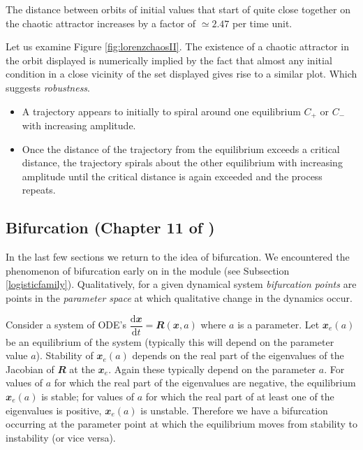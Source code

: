 \documentclass[
  a4paper,
  oneside,
  final]{krantz}
\providecommand{\tightlist}{%
  \setlength{\itemsep}{0pt}\setlength{\parskip}{0pt}}
\renewcommand{\d}{\mathrm{d}}
\renewcommand{\v}[1]{{\mathbfit{#1}}}
\newcommand{\der}[2]{\dfrac{\d #1}{\d #2}}
\theoremstyle{definition}
\theoremstyle{definition}
\theoremstyle{definition}
\theoremstyle{definition}
\theoremstyle{remark}
\begin{document}
The distance between orbits of initial values that start of quite close
together on the chaotic attractor increases by a factor of \(\simeq 2.47\)
per time unit.

Let us examine Figure \ref{fig:lorenzchaosII}. The existence of a
chaotic attractor in the orbit displayed is numerically implied by the fact
that almost any initial condition in a close vicinity of the set
displayed gives rise to a similar plot. Which suggests \emph{robustness}.

\begin{itemize}
\tightlist
\item
  A trajectory appears to initially to spiral around one equilibrium
  \(C_{+}\) or \(C_{-}\) with increasing amplitude.
\item
  Once the distance of the trajectory from the equilibrium exceeds a
  critical distance, the trajectory spirals about the other
  equilibrium with increasing amplitude until the critical distance is
  again exceeded and the process repeats.
\end{itemize}

\hypertarget{bifurcation}{%
\subsection{\texorpdfstring{Bifurcation (Chapter 11 of \citep{ASY})}{Bifurcation (Chapter 11 of {[}@ASY{]})}}\label{bifurcation}}

In the last few sections we return to the idea of bifurcation. We
encountered the phenomenon of bifurcation early on in the module (see
Subsection \ref{logisticfamily}). Qualitatively, for a given dynamical
system \emph{bifurcation points} are points in the \emph{parameter space} at which
qualitative change in the dynamics occur.

Consider a system of ODE's \(\der{\v{x}}{t} = \v{R}(\v{x}, a)\) where \(a\)
is a parameter. Let \(\v{x}_{e}(a)\) be an equilibrium of the system
(typically this will depend on the parameter value \(a\)). Stability of
\(\v{x}_{e}(a)\) depends on the real part of the eigenvalues of the
Jacobian of \(\v{R}\) at the \(\v{x}_{e}\). Again these typically
depend on the parameter \(a\). For values of \(a\) for which the real part
of the eigenvalues are negative, the equilibrium \(\v{x}_{e}(a)\) is
stable; for values of \(a\) for which the real part of at least one of the
eigenvalues is positive, \(\v{x}_{e}(a)\) is unstable. Therefore we have a
bifurcation occurring at the parameter point at which the equilibrium
moves from stability to instability (or vice versa).
\end{document}
